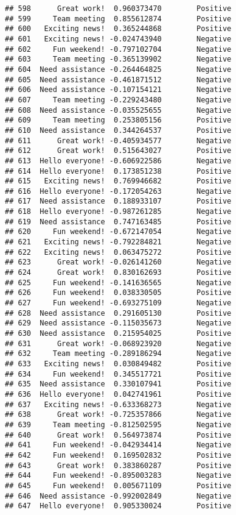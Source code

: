 \documentclass[
]{article}
\begin{document}
\begin{verbatim}
## 598      Great work!  0.960373470        Positive
## 599     Team meeting  0.855612874        Positive
## 600   Exciting news!  0.365244868        Positive
## 601   Exciting news! -0.024743940        Negative
## 602     Fun weekend! -0.797102704        Negative
## 603     Team meeting -0.365139902        Negative
## 604  Need assistance -0.264464825        Negative
## 605  Need assistance -0.461871512        Negative
## 606  Need assistance -0.107154121        Negative
## 607     Team meeting -0.229243480        Negative
## 608  Need assistance -0.035525655        Negative
## 609     Team meeting  0.253805156        Positive
## 610  Need assistance  0.344264537        Positive
## 611      Great work! -0.405934577        Negative
## 612      Great work!  0.515643027        Positive
## 613  Hello everyone! -0.606922586        Negative
## 614  Hello everyone!  0.173851238        Positive
## 615   Exciting news!  0.769946682        Positive
## 616  Hello everyone! -0.172054263        Negative
## 617  Need assistance  0.188933107        Positive
## 618  Hello everyone! -0.987261285        Negative
## 619  Need assistance  0.747163485        Positive
## 620     Fun weekend! -0.672147054        Negative
## 621   Exciting news! -0.792284821        Negative
## 622   Exciting news!  0.063475272        Positive
## 623      Great work! -0.026141260        Negative
## 624      Great work!  0.830162693        Positive
## 625     Fun weekend! -0.141636565        Negative
## 626     Fun weekend!  0.038330505        Positive
## 627     Fun weekend! -0.693275109        Negative
## 628  Need assistance  0.291605130        Positive
## 629  Need assistance -0.115035673        Negative
## 630  Need assistance  0.215954025        Positive
## 631      Great work! -0.068923920        Negative
## 632     Team meeting -0.289186294        Negative
## 633   Exciting news!  0.030849482        Positive
## 634     Fun weekend!  0.345517721        Positive
## 635  Need assistance  0.330107941        Positive
## 636  Hello everyone!  0.042741961        Positive
## 637   Exciting news! -0.633368273        Negative
## 638      Great work! -0.725357866        Negative
## 639     Team meeting -0.812502595        Negative
## 640      Great work!  0.564973874        Positive
## 641     Fun weekend! -0.042934414        Negative
## 642     Fun weekend!  0.169502832        Positive
## 643      Great work!  0.383860287        Positive
## 644     Fun weekend! -0.895003283        Negative
## 645     Fun weekend!  0.005671109        Positive
## 646  Need assistance -0.992002849        Negative
## 647  Hello everyone!  0.905330024        Positive

\end{verbatim}
\end{document}
